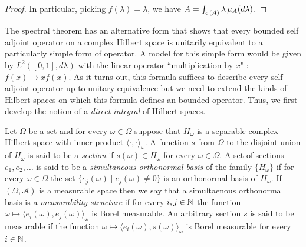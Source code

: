 \begin{proof}
In particular, picking $f(\lambda) = \lambda$, we have $A = \int_{\sigma(A)} \lambda  \, \mu_A(d\lambda)$.
\end{proof}

The spectral theorem has an alternative form that shows that every
bounded self adjoint operator on a complex Hilbert space is unitarily
equivalent to a particularly simple form of operator.   A model for
this simple form would be given by $L^2([0,1], d\lambda)$ with the
linear operator ``multiplication by $x$" : $f(x) \to x f(x)$.  As it
turns out, this formula suffices to describe every self adjoint
operator up to unitary equivalence but we need to extend the kinds of Hilbert spaces on which
this formula defines an bounded operator.   Thus, we first develop the
notion of a \emph{direct integral} of Hilbert spaces.

\begin{defn}Let $\Omega$ be a set and for every $\omega \in \Omega$ suppose that $H_\omega$ is a separable complex Hilbert space with inner product $\langle \cdot, \cdot \rangle_\omega$.  A function $s$ from $\Omega$ to the disjoint union of $H_\omega$ is said to be a \emph{section} if $s(\omega) \in H_\omega$ for every $\omega \in \Omega$.  A set of sections $e_1, e_2, \dotsc$ is said to be a \emph{simultaneous orthonormal basis} of the family $\lbrace H_\omega \rbrace$ if for every $\omega \in \Omega$ the set $\lbrace e_j(\omega) \mid e_j(\omega) \neq 0 \rbrace$ is an orthonormal basis of $H_\omega$.  If $(\Omega, \mathcal{A})$ is a measurable space then we say that a simultaenous orthonormal basis is a \emph{measurability structure} if for every $i,j \in \mathbb{N}$ the function $\omega \mapsto \langle e_i(\omega), e_j(\omega) \rangle_\omega$ is Borel measurable.   An arbitrary section $s$ is said to be measurable if the function 
$\omega \mapsto \langle e_i(\omega), s(\omega) \rangle_\omega$ is Borel measurable for every $i \in \mathbb{N}$.
\end{defn}

